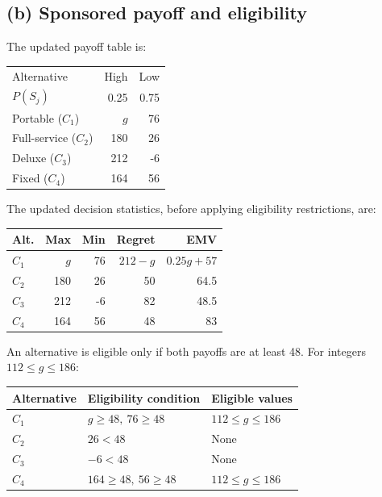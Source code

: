 \label{sol:q2b}
\subsection*{(b) Sponsored payoff and eligibility }

The updated payoff table is:

\begin{center}\small\setlength{\tabcolsep}{4pt}
	\begin{tabular}{lrr}\toprule
		Alternative & High & Low\\
		$P(S_j)$ & 0.25 & 0.75\\ \midrule
				Portable ($C_1$) & $g$ & 76\\
		Full-service ($C_2$) & 180 & 26\\
		Deluxe ($C_3$) & 212 & -6\\
		Fixed ($C_4$) & 164 & 56\\
		\bottomrule
	\end{tabular}
\end{center}

The updated decision statistics, before applying
eligibility restrictions, are:

\begin{center}\small\setlength{\tabcolsep}{4pt}
	\begin{tabular}{lrrrr}\toprule
		Alt. & Max & Min & Regret & EMV\\ \midrule
				$C_1$ & $g$ & 76 & $212-g$ & $0.25g+57$\\
		$C_2$ & 180 & 26 & 50 & 64.5\\
		$C_3$ & 212 & -6 & 82 & 48.5\\
		$C_4$ & 164 & 56 & 48 & 83\\
		\bottomrule
	\end{tabular}
\end{center}

An alternative is eligible only if both payoffs
are at least 48. For integers $112\le g\le186$:

\begin{center}
\begin{tabular}{lll}\toprule
Alternative & Eligibility condition & Eligible values\\\midrule
$C_1$ & $g\ge48,\ 76\ge48$ & $112\le g\le186$\\
$C_2$ & $26<48$ & None\\
$C_3$ & $-6<48$ & None\\
$C_4$ & $164\ge48,\ 56\ge48$ & $112\le g\le186$\\
\bottomrule
\end{tabular}
\end{center}

